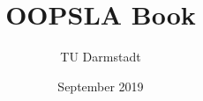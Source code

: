 \begin{titlepage}
	\author{TU Darmstadt}
	\title{OOPSLA Book}
	\date{September 2019}
\end{titlepage}